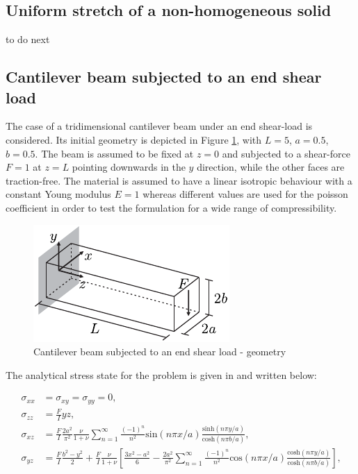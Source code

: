 \documentclass[english,11pt,3p,number,sort&compress]{elsarticle}
\newcommand{\giovane}{\color{red}{\bf\Large GA} \color{cyan} }
\begin{document}
\subsection{Uniform stretch of a non-homogeneous solid \label{subsec:non-homogeneous}}

{\giovane to do next}

\subsection{Cantilever beam subjected to an end shear load \label{subsec:bishop}}

The case of a tridimensional cantilever beam under an end shear-load is considered. Its initial geometry is depicted in Figure \ref{fig:bishop-beam-geometry}, with $L=5$, $a=0.5$, $b=0.5$. The beam is assumed to be fixed at $z=0$ and subjected to a shear-force $F=1$ at $z=L$ pointing downwards in the $y$ direction, while the other faces are traction-free. The material is assumed to have a linear isotropic behaviour with a constant Young modulus $E=1$ whereas different values are used for the poisson coefficient in order to test the formulation for a wide range of compressibility.

\begin{figure}[H]
	\centering
	\includegraphics[scale=1.0]{bishop-beam-geometry}
	\caption{Cantilever beam subjected to an end shear load - geometry}
	\label{fig:bishop-beam-geometry}
\end{figure}

The analytical stress state for the problem is given in \cite{bishop2014displacement} and written below:

\begin{equation} \label{eq:bishop-stress}
	\begin{aligned}
		\sigma_{xx} &= \sigma_{xy} = \sigma_{yy} = 0 \text{,}\\
		\sigma_{zz} &= \frac{F}{I} yz \text{,}\\
		\sigma_{xz} &= \frac{F}{I} \frac{2a^2}{\pi^2}\frac{\nu}{1+\nu} \sum_{n=1}^{\infty} \frac{(-1)^n}{n^2} \text{sin}\left(n\pi x/a\right) \frac{\text{sinh}\left( n\pi y/a \right)}{\text{cosh}\left( n\pi b/a \right)} \text{,}\\
		\sigma_{yz} &= \frac{F}{I} \frac{b^2-y^2}{2} + \frac{F}{I}\frac{\nu}{1+\nu} \left[ \frac{3x^2-a^2}{6} - \frac{2a^2}{\pi^2} \sum_{n=1}^{\infty} \frac{(-1)^n}{n^2} \text{cos}\left(n\pi x/a\right) \frac{\text{cosh}\left( n\pi y/a \right)}{\text{cosh}\left( n\pi b/a \right)}  \right]\text{,}\\
	\end{aligned}
\end{equation}
\end{document}
